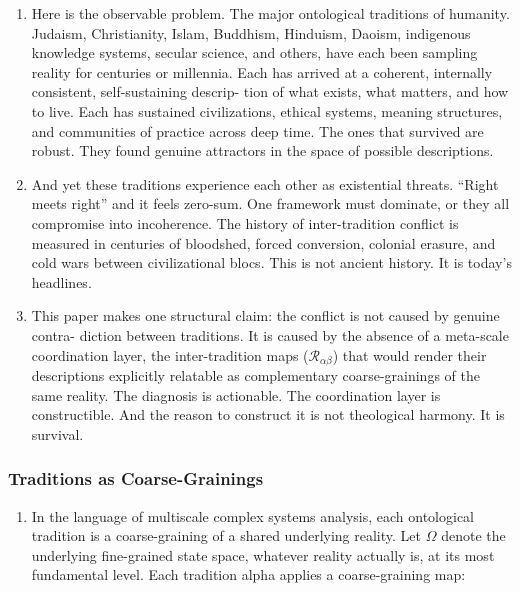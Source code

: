 \documentclass[
]{article}
\providecommand{\tightlist}{%
  \setlength{\itemsep}{0pt}\setlength{\parskip}{0pt}}
\begin{document}
\begin{enumerate}
\def\labelenumi{\arabic{enumi}.}
\tightlist
\item
  Here is the observable problem. The major ontological traditions of
  humanity. Judaism, Christianity, Islam, Buddhism, Hinduism, Daoism,
  indigenous knowledge systems, secular science, and others, have each
  been sampling reality for centuries or millennia. Each has arrived at
  a coherent, internally consistent, self-sustaining descrip- tion of
  what exists, what matters, and how to live. Each has sustained
  civilizations, ethical systems, meaning structures, and communities of
  practice across deep time. The ones that survived are robust. They
  found genuine attractors in the space of possible descriptions.
\item
  And yet these traditions experience each other as existential threats.
  ``Right meets right'' and it feels zero-sum. One framework must
  dominate, or they all compromise into incoherence. The history of
  inter-tradition conflict is measured in centuries of bloodshed, forced
  conversion, colonial erasure, and cold wars between civilizational
  blocs. This is not ancient history. It is today's headlines.
\item
  This paper makes one structural claim: the conflict is not caused by
  genuine contra- diction between traditions. It is caused by the
  absence of a meta-scale coordination layer, the inter-tradition maps
  (\(\mathcal{R}_{\alpha\beta}\)) that would render their descriptions
  explicitly relatable as complementary coarse-grainings of the same
  reality. The diagnosis is actionable. The coordination layer is
  constructible. And the reason to construct it is not theological
  harmony. It is survival.
\end{enumerate}

\subsubsection{Traditions as
Coarse-Grainings}\label{traditions-as-coarse-grainings}

\begin{enumerate}
\def\labelenumi{\arabic{enumi}.}
\setcounter{enumi}{3}
\tightlist
\item
  In the language of multiscale complex systems analysis, each
  ontological tradition is a coarse-graining of a shared underlying
  reality. Let \(\Omega\) denote the underlying fine-grained state
  space, whatever reality actually is, at its most fundamental level.
  Each tradition alpha applies a coarse-graining map:
\end{enumerate}
\end{document}
